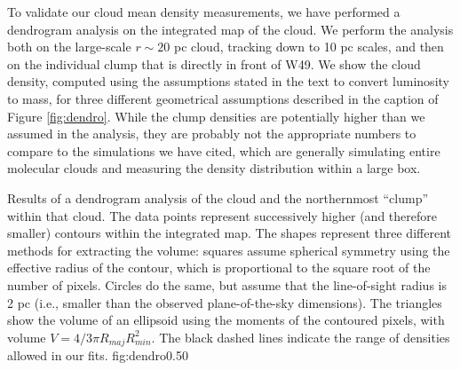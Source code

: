To validate our cloud mean density measurements, we have performed a dendrogram
analysis \citep{Rosolowsky2008c} on the integrated \thirteenco map of the
\GRSMC cloud.  We perform the analysis both on the large-scale $r\sim20$ pc
cloud, tracking down to 10 pc scales, and then on the individual clump that is
directly in front of W49.  We show the cloud density, computed using the
assumptions stated in the text to convert \thirteenco luminosity to mass, for
three different geometrical assumptions described in the caption of Figure
\ref{fig:dendro}.  While the clump densities are potentially higher than we
assumed in the analysis, they are probably not the appropriate numbers to
compare to the simulations we have cited, which are generally simulating entire
molecular clouds and measuring the density distribution within a large box.

{Results of a dendrogram analysis of the \GRSMC cloud and the
northernmost \thirteenco ``clump'' within that cloud.  The data points represent
successively higher (and therefore smaller) contours within the integrated \thirteenco
map.  The shapes represent three different methods
for extracting the volume: squares assume spherical symmetry using the
effective radius of the contour, which is proportional to the square root of
the number of pixels.  Circles do the same, but assume that the line-of-sight
radius is 2 pc (i.e., smaller than the observed plane-of-the-sky
dimensions).  The triangles show the volume of an ellipsoid using the moments of the
contoured pixels, with volume $V=4/3 \pi R_{maj}R_{min}^2$.  The black dashed lines
indicate the range of densities allowed in our fits.}
{fig:dendro}{0.5}{0}


